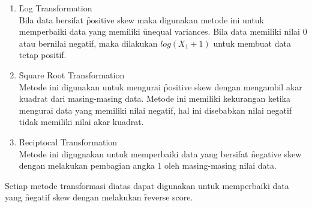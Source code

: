 \begin{enumerate}
	\item \f{Log Transformation}\\
	Bila data bersifat \f{positive skew} maka digunakan metode ini untuk memperbaiki data yang memiliki \f{unequal variances}. Bila data memiliki nilai 0 atau bernilai negatif, maka dilakukan $log(X_{1}+1)$ untuk membuat data tetap positif.
	\item \f{Square Root Transformation}\\
	Metode ini digunakan untuk mengurai \f{positive skew} dengan mengambil akar kuadrat dari masing-masing data. Metode ini memiliki kekurangan ketika mengurai data yang memiliki nilai negatif, hal ini disebabkan nilai negatif tidak memiliki nilai akar kuadrat.
	\item \f{Reciptocal Transformation}\\
	Metode ini digugnakan untuk memperbaiki data yang bersifat \f{negative skew} dengan melakukan pembagian angka 1 oleh masing-masing nilai data.
\end{enumerate}
Setiap metode transformasi diatas dapat digunakan untuk memperbaiki data yang \f{negatif skew} dengan melakukan \f{reverse score}.
